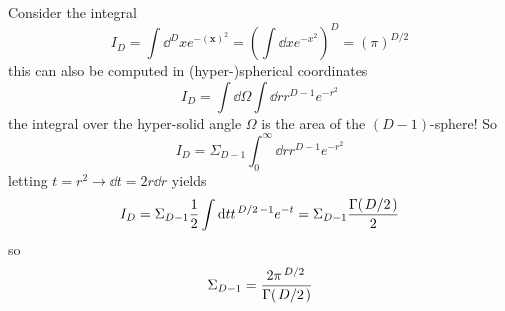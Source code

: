 Consider the integral
$$I_D = \int \dd^Dx e^{-(\mathbf{x})^2}=\left(\int \dd x e^{-x^2}\right)^D=
(\pi)^{D/2}$$
this can also be computed in (hyper-)spherical coordinates
$$I_D = \int \dd\Omega\int \dd r r^{D-1}e^{-r^2} $$
the integral over the hyper-solid angle $\Omega$ is the area of the
$(D-1)$-sphere! So
$$I_D = \Sigma_{D-1}\int_0^\infty \dd r r^{D-1}e^{-r^2}$$
letting $t=r^2\to \dd t = 2r\dd r$ yields
$$I_D = \Sigma_{D-1}\frac{1}{2}\int \dd t t^{\flatfrac{D}{2}-1}e^{-t} =
\Sigma_{D-1}\frac{\Gamma(\flatfrac{D}{2})}{2}$$
so
$$\Sigma_{D-1} = \frac{2\pi^{\flatfrac{D}{2}}}{\Gamma(\flatfrac{D}{2})}$$

